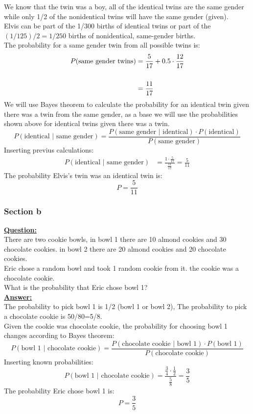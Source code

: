 \documentclass[a4, 12pt,titlepage]{scrartcl}
\begin{document}
We know that the twin was a boy, all of the identical twins are the same gender while only 1/2 of the nonidentical twins will have the same gender (given).\\
Elvis can be part of the 1/300 births of identical twins or part of the $(1/125)/2=1/250$ births of nonidentical, same-gender births.\\
The probability for a same gender twin from all possible twins is:
\begin{align*}
P(\textrm{same gender twins})&=\frac{5}{17}+0.5\cdot \frac{12}{17}\\\smallskip\\
&=\frac{11}{17}
\end{align*}
We will use Bayes theorem to calculate the probability for an identical twin given there was a twin from the same gender, as a base we will use the probabilities shown above for identical twins given there was a twin.\[
P(\textrm{identical $|$ same gender})=\frac{P(\textrm{same gender $|$ identical})\cdot P(\textrm{identical})}{P(\textrm{same gender})}
\]Inserting previus calculations:
\begin{align*}
P(\textrm{identical $|$ same gender})&=\frac{1\cdot \frac{5}{17}}{\frac{11}{17}}=\frac{5}{11}
\end{align*}
The probability Elvis's twin was an identical twin is:
\[
\boxed{P=\frac{5}{11}}
\]
\newpage
\subsubsection{Section b}
\textbf{\underline{Question:}}\\
There are two cookie bowls, in bowl 1 there are 10 almond cookies and 30 chocolate cookies. in bowl 2 there are 20 almond cookies and 20 chocolate cookies.\\
Eric chose a random bowl and took 1 random cookie from it. the cookie was a chocolate cookie.\\
What is the probability that Eric chose bowl 1?\\
\textbf{\underline{Answer:}}\\
The probability to pick bowl 1 is 1/2 (bowl 1 or bowl 2),
The probability to pick a chocolate cookie is 50/80=5/8.\\
Given the cookie was chocolate cookie, the probability for choosing bowl 1 changes according to Bayes theorem:\\
\[
P(\textrm{bowl 1 $|$ chocolate cookie})=\frac{P(\textrm{chocolate cookie $|$ bowl 1})\cdot P(\textrm{bowl 1})}{P(\textrm{chocolate cookie})}
\]
Inserting known probabilities:
\[
P(\textrm{bowl 1 $|$ chocolate cookie})=\frac{\frac{3}{4}\cdot \frac{1}{2}}{\frac{5}{8}}=\frac{3}{5}
\]
The probability Eric chose bowl 1 is:
\[
\boxed{P=\frac{3}{5}}
\]
\newpage
\end{document}
